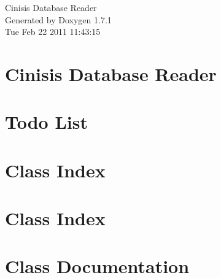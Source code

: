 \documentclass[a4paper]{book}
\begin{document}
\hypersetup{pageanchor=false}
\begin{titlepage}
\vspace*{7cm}
\begin{center}
{\Large Cinisis Database Reader }\\
\vspace*{1cm}
{\large Generated by Doxygen 1.7.1}\\
\vspace*{0.5cm}
{\small Tue Feb 22 2011 11:43:15}\\
\end{center}
\end{titlepage}
\clearemptydoublepage
{}
\tableofcontents
\clearemptydoublepage
{}
\hypersetup{pageanchor=true}
\chapter{Cinisis Database Reader}
\label{index}\hypertarget{index}{}
\chapter{Todo List}
\label{todo}
\hypertarget{todo}{}

\chapter{Class Index}

\chapter{Class Index}

\chapter{Class Documentation}





















\printindex
\end{document}
